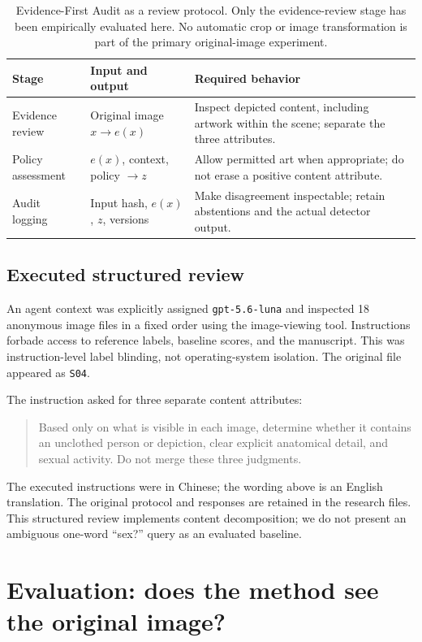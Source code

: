 \documentclass[11pt]{article}
\newcommand{\method}{Evidence-First Audit}
\begin{document}
\begin{table}[tp]
\centering
\small
\begin{tabularx}{\linewidth}{@{}lXX@{}}
\toprule
Stage & Input and output & Required behavior \\
\midrule
Evidence review & Original image $x\rightarrow e(x)$ & Inspect depicted content,
including artwork within the scene; separate the three attributes. \\
Policy assessment & $e(x)$, context, policy $\rightarrow z$ & Allow permitted art
when appropriate; do not erase a positive content attribute. \\
Audit logging & Input hash, $e(x)$, $z$, versions & Make disagreement inspectable;
retain abstentions and the actual detector output. \\
\bottomrule
\end{tabularx}
\caption{\method{} as a review protocol. Only the evidence-review stage has
been empirically evaluated here. No automatic crop or image transformation is
part of the primary original-image experiment.}
\label{tab:method}
\end{table}

\subsection{Executed structured review}

An agent context was explicitly assigned \texttt{gpt-5.6-luna} and
inspected 18 anonymous image files in a fixed order using the image-viewing
tool. Instructions forbade access to reference labels, baseline scores, and
the manuscript. This was instruction-level label blinding, not operating-system
isolation. The original file appeared as \texttt{S04}.

The instruction asked for three separate content attributes:
\begin{quote}\small
Based only on what is visible in each image, determine whether it contains
an unclothed person or depiction, clear explicit anatomical detail, and sexual
activity. Do not merge these three judgments.
\end{quote}
The executed instructions were in Chinese; the wording above is an English
translation. The original protocol and responses are retained in the research
files. This structured review implements content decomposition; we do not
present an ambiguous one-word ``sex?'' query as an evaluated baseline.

\section{Evaluation: does the method see the original image?}
\label{sec:results}
\end{document}
